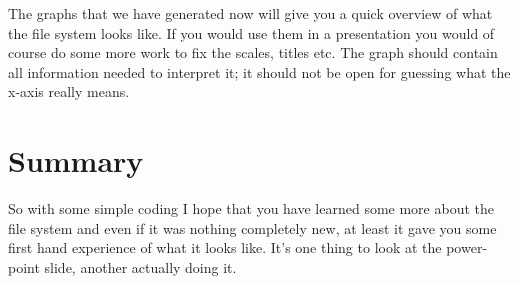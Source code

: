 \documentclass[a4paper,11pt]{article}
\begin{document}
The graphs that we have generated now will give you a quick overview
of what the file system looks like. If you would use them in a
presentation you would of course do some more work to fix the scales,
titles etc. The graph should contain all information needed to
interpret it; it should not be open for guessing what the x-axis
really means.


\section{Summary}

So with some simple coding I hope that you have learned some more about
the file system and even if it was nothing completely new, at least it
gave you some first hand experience of what it looks like. It's one
thing to look at the power-point slide, another actually doing it.
\end{document}
